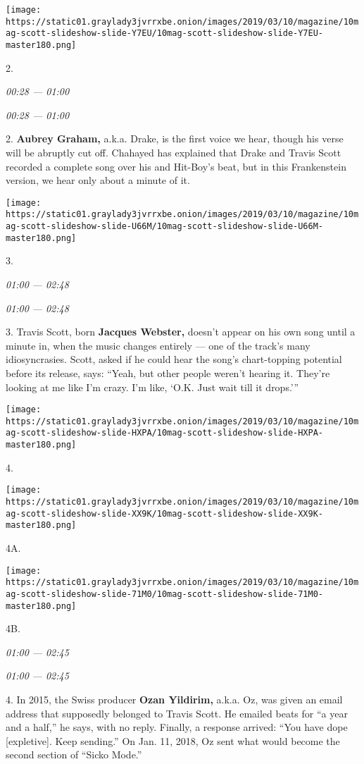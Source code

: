 \texttt{[image: https://static01.graylady3jvrrxbe.onion/images/2019/03/10/magazine/10mag-scott-slideshow-slide-Y7EU/10mag-scott-slideshow-slide-Y7EU-master180.png]}

2.

\emph{00:28 --- 01:00}

\emph{00:28 --- 01:00}

2. \textbf{Aubrey Graham,} a.k.a. Drake, is the first voice we hear,
though his verse will be abruptly cut off. Chahayed has explained that
Drake and Travis Scott recorded a complete song over his and Hit-Boy's
beat, but in this Frankenstein version, we hear only about a minute of
it.

\texttt{[image: https://static01.graylady3jvrrxbe.onion/images/2019/03/10/magazine/10mag-scott-slideshow-slide-U66M/10mag-scott-slideshow-slide-U66M-master180.png]}

3.

\emph{01:00} \emph{--- 02:48}

\emph{01:00} \emph{--- 02:48}

3. Travis Scott, born \textbf{Jacques Webster,} doesn't appear on his
own song until a minute in, when the music changes entirely --- one of
the track's many idiosyncrasies. Scott, asked if he could hear the
song's chart-topping potential before its release, says: ``Yeah, but
other people weren't hearing it. They're looking at me like I'm crazy.
I'm like, `O.K. Just wait till it drops.'''

\texttt{[image: https://static01.graylady3jvrrxbe.onion/images/2019/03/10/magazine/10mag-scott-slideshow-slide-HXPA/10mag-scott-slideshow-slide-HXPA-master180.png]}

4.

\texttt{[image: https://static01.graylady3jvrrxbe.onion/images/2019/03/10/magazine/10mag-scott-slideshow-slide-XX9K/10mag-scott-slideshow-slide-XX9K-master180.png]}

4A.

\texttt{[image: https://static01.graylady3jvrrxbe.onion/images/2019/03/10/magazine/10mag-scott-slideshow-slide-71M0/10mag-scott-slideshow-slide-71M0-master180.png]}

4B.

\emph{01:00} \emph{--- 02:45}

\emph{01:00} \emph{--- 02:45}

4. In 2015, the Swiss producer \textbf{Ozan Yildirim,} a.k.a. Oz, was
given an email address that supposedly belonged to Travis Scott. He
emailed beats for ``a year and a half,'' he says, with no reply.
Finally, a response arrived: ``You have dope {[}expletive{]}. Keep
sending.'' On Jan. 11, 2018, Oz sent what would become the second
section of ``Sicko Mode.''

